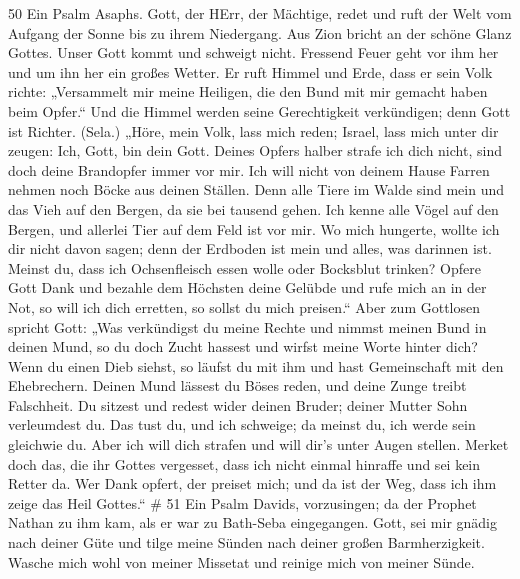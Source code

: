 50  Ein Psalm Asaphs. Gott, der HErr, der Mächtige, redet
und ruft der Welt vom Aufgang der Sonne bis zu ihrem Niedergang.
 Aus Zion bricht an der schöne Glanz Gottes. 
Unser Gott kommt und schweigt nicht. Fressend Feuer geht vor ihm her und
um ihn her ein großes Wetter.  Er ruft Himmel und Erde, dass
er sein Volk richte:  „Versammelt mir meine Heiligen, die
den Bund mit mir gemacht haben beim Opfer.``  Und die Himmel
werden seine Gerechtigkeit verkündigen; denn Gott ist Richter. (Sela.)
 „Höre, mein Volk, lass mich reden; Israel, lass mich unter
dir zeugen: Ich, Gott, bin dein Gott.  Deines Opfers halber
strafe ich dich nicht, sind doch deine Brandopfer immer vor mir.
 Ich will nicht von deinem Hause Farren nehmen noch Böcke
aus deinen Ställen.  Denn alle Tiere im Walde sind mein und
das Vieh auf den Bergen, da sie bei tausend gehen.  Ich
kenne alle Vögel auf den Bergen, und allerlei Tier auf dem Feld ist vor
mir.  Wo mich hungerte, wollte ich dir nicht davon sagen;
denn der Erdboden ist mein und alles, was darinnen ist. 
Meinst du, dass ich Ochsenfleisch essen wolle oder Bocksblut trinken?
 Opfere Gott Dank und bezahle dem Höchsten deine Gelübde
 und rufe mich an in der Not, so will ich dich erretten, so
sollst du mich preisen.``  Aber zum Gottlosen spricht Gott:
„Was verkündigst du meine Rechte und nimmst meinen Bund in deinen Mund,
 so du doch Zucht hassest und wirfst meine Worte hinter
dich?  Wenn du einen Dieb siehst, so läufst du mit ihm und
hast Gemeinschaft mit den Ehebrechern.  Deinen Mund lässest
du Böses reden, und deine Zunge treibt Falschheit.  Du
sitzest und redest wider deinen Bruder; deiner Mutter Sohn verleumdest
du.  Das tust du, und ich schweige; da meinst du, ich werde
sein gleichwie du. Aber ich will dich strafen und will dir's unter Augen
stellen.  Merket doch das, die ihr Gottes vergesset, dass
ich nicht einmal hinraffe und sei kein Retter da.  Wer Dank
opfert, der preiset mich; und da ist der Weg, dass ich ihm zeige das
Heil Gottes.`` \# 51  Ein Psalm Davids, vorzusingen;
 da der Prophet Nathan zu ihm kam, als er war zu Bath-Seba
eingegangen.  Gott, sei mir gnädig nach deiner Güte und
tilge meine Sünden nach deiner großen Barmherzigkeit. 
Wasche mich wohl von meiner Missetat und reinige mich von meiner Sünde.
